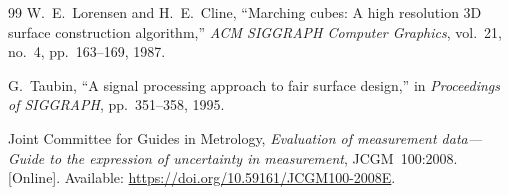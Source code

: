\begin{thebibliography}{99}
W.~E.~Lorensen and H.~E.~Cline, ``Marching cubes: A high resolution 3D surface construction algorithm,'' \emph{ACM SIGGRAPH Computer Graphics}, vol.~21, no.~4, pp.~163--169, 1987.

G.~Taubin, ``A signal processing approach to fair surface design,'' in \emph{Proceedings of SIGGRAPH}, pp.~351--358, 1995.

Joint Committee for Guides in Metrology, \emph{Evaluation of measurement data---Guide to the expression of uncertainty in measurement}, JCGM~100:2008. [Online]. Available: \url{https://doi.org/10.59161/JCGM100-2008E}.
\end{thebibliography}

